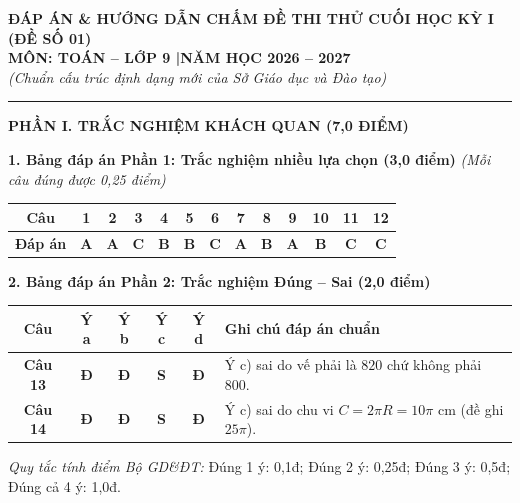 \documentclass[11pt,a4paper]{article}
\begin{document}
\begin{center}
{\large\bfseries ĐÁP ÁN \& HƯỚNG DẪN CHẤM ĐỀ THI THỬ CUỐI HỌC KỲ I (ĐỀ SỐ 01)}\\[1.5mm]
{\bfseries MÔN: TOÁN -- LỚP 9 \quad|\quad NĂM HỌC 2026 -- 2027}\\[1mm]
\textit{(Chuẩn cấu trúc định dạng mới của Sở Giáo dục và Đào tạo)}
\end{center}

\vspace{1mm}
\hrule
\vspace{3mm}

\noindent
\textbf{\large PHẦN I. TRẮC NGHIỆM KHÁCH QUAN (7,0 ĐIỂM)}

\vspace{2mm}
\noindent
\textbf{1. Bảng đáp án Phần 1: Trắc nghiệm nhiều lựa chọn (3,0 điểm)} \textit{(Mỗi câu đúng được 0,25 điểm)}
\begin{center}
\begin{tabular}{|c|c|c|c|c|c|c|c|c|c|c|c|c|}
\hline
\textbf{Câu} & \textbf{1} & \textbf{2} & \textbf{3} & \textbf{4} & \textbf{5} & \textbf{6} & \textbf{7} & \textbf{8} & \textbf{9} & \textbf{10} & \textbf{11} & \textbf{12} \\
\hline
\textbf{Đáp án} & \textbf{A} & \textbf{A} & \textbf{C} & \textbf{B} & \textbf{B} & \textbf{C} & \textbf{A} & \textbf{B} & \textbf{A} & \textbf{B} & \textbf{C} & \textbf{C} \\
\hline
\end{tabular}
\end{center}

\vspace{2mm}
\noindent
\textbf{2. Bảng đáp án Phần 2: Trắc nghiệm Đúng -- Sai (2,0 điểm)}
\begin{center}
\begin{tabular}{|c|c|c|c|c|l|}
\hline
\textbf{Câu} & \textbf{Ý a} & \textbf{Ý b} & \textbf{Ý c} & \textbf{Ý d} & \textbf{Ghi chú đáp án chuẩn} \\
\hline
\textbf{Câu 13} & \textbf{Đ} & \textbf{Đ} & \textbf{S} & \textbf{Đ} & Ý c) sai do vế phải là $820$ chứ không phải $800$. \\
\hline
\textbf{Câu 14} & \textbf{Đ} & \textbf{Đ} & \textbf{S} & \textbf{Đ} & Ý c) sai do chu vi $C = 2\pi R = 10\pi\text{ cm}$ (đề ghi $25\pi$). \\
\hline
\end{tabular}
\end{center}
\textit{Quy tắc tính điểm Bộ GD\&ĐT:} Đúng 1 ý: 0,1đ; Đúng 2 ý: 0,25đ; Đúng 3 ý: 0,5đ; Đúng cả 4 ý: 1,0đ.
\end{document}
